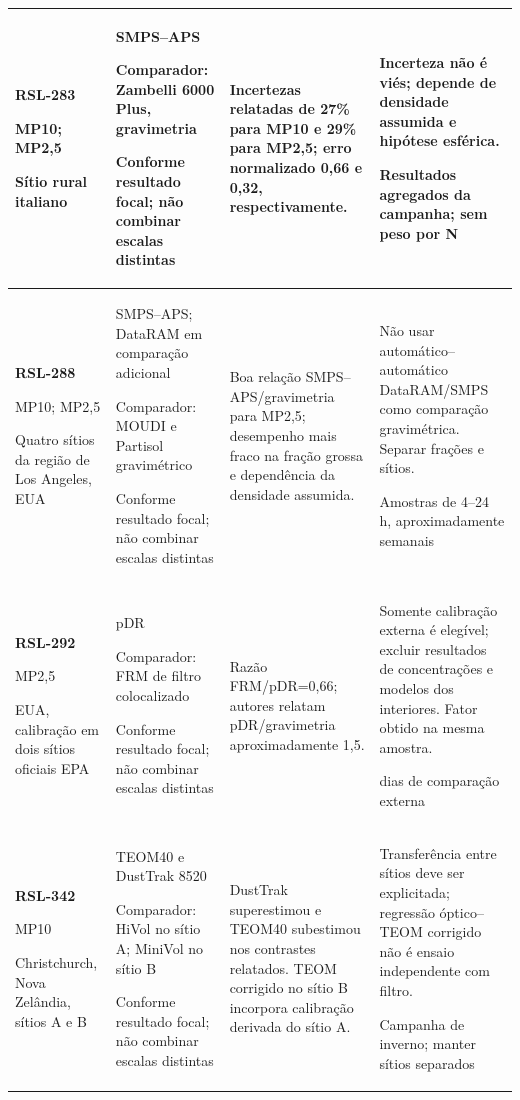 \begin{longtable}{|P{0.18\textwidth}|P{0.25\textwidth}|P{0.28\textwidth}|P{\arrayrulewidth\relax}|}
\textbf{RSL-283}\par\textcite{rsl283}\par MP10; MP2,5\par Sítio rural italiano & SMPS--APS\par\medskip Comparador: Zambelli 6000 Plus, gravimetria\par\medskip Conforme resultado focal; não combinar escalas distintas & Incertezas relatadas de 27\% para MP10 e 29\% para MP2,5; erro normalizado 0,66 e 0,32, respectivamente. & Incerteza não é viés; depende de densidade assumida e hipótese esférica.\par\medskip Resultados agregados da campanha; sem peso por N\\\hline
\textbf{RSL-288}\par\textcite{rsl288}\par MP10; MP2,5\par Quatro sítios da região de Los Angeles, EUA & SMPS--APS; DataRAM em comparação adicional\par\medskip Comparador: MOUDI e Partisol gravimétrico\par\medskip Conforme resultado focal; não combinar escalas distintas & Boa relação SMPS--APS/gravimetria para MP2,5; desempenho mais fraco na fração grossa e dependência da densidade assumida. & Não usar automático--automático DataRAM/SMPS como comparação gravimétrica. Separar frações e sítios.\par\medskip Amostras de 4--24 h, aproximadamente semanais\\\hline
\textbf{RSL-292}\par\textcite{rsl292}\par MP2,5\par EUA, calibração em dois sítios oficiais EPA & pDR\par\medskip Comparador: FRM de filtro colocalizado\par\medskip Conforme resultado focal; não combinar escalas distintas & Razão FRM/pDR=0,66; autores relatam pDR/gravimetria aproximadamente 1,5. & Somente calibração externa é elegível; excluir resultados de concentrações e modelos dos interiores. Fator obtido na mesma amostra.\par{} dias de comparação externa\\\hline
\textbf{RSL-342}\par\textcite{rsl342}\par MP10\par Christchurch, Nova Zelândia, sítios A e B & TEOM40 e DustTrak 8520\par\medskip Comparador: HiVol no sítio A; MiniVol no sítio B\par\medskip Conforme resultado focal; não combinar escalas distintas & DustTrak superestimou e TEOM40 subestimou nos contrastes relatados. TEOM corrigido no sítio B incorpora calibração derivada do sítio A. & Transferência entre sítios deve ser explicitada; regressão óptico--TEOM corrigido não é ensaio independente com filtro.\par\medskip Campanha de inverno; manter sítios separados\\\hline

\end{longtable}
